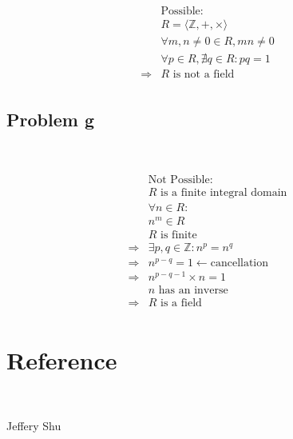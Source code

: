 \documentclass{article}
\begin{document}
~

\begin{align*}
    &\text{Possible}:\\
    &R=\langle\mathbb{Z} ,+,\times\rangle\\
    &\forall m,n\ne0\in R,mn\ne0\\
    &\forall p\in R,\nexists q\in R: pq=1\\
    \Rightarrow&R\text{ is not a field}\\
\end{align*}

\subsection*{Problem g}

~

\begin{align*}
    &\text{Not Possible}:\\
    &R\text{ is a finite integral domain}\\
    &\forall n\in R:\\
    &n^m\in R\\
    &R\text{ is finite}\\
    \Rightarrow&\exists p,q\in\mathbb{Z} :n^p=n^q\\
    \Rightarrow&n^{p-q}=1\leftarrow \text{cancellation}\\
    \Rightarrow&n^{p-q-1}\times n=1\\
    &n\text{ has an inverse}\\
    \Rightarrow&R\text{ is a field}\\
\end{align*}

\newpage

\section*{Reference}

~

Jeffery Shu
\end{document}
